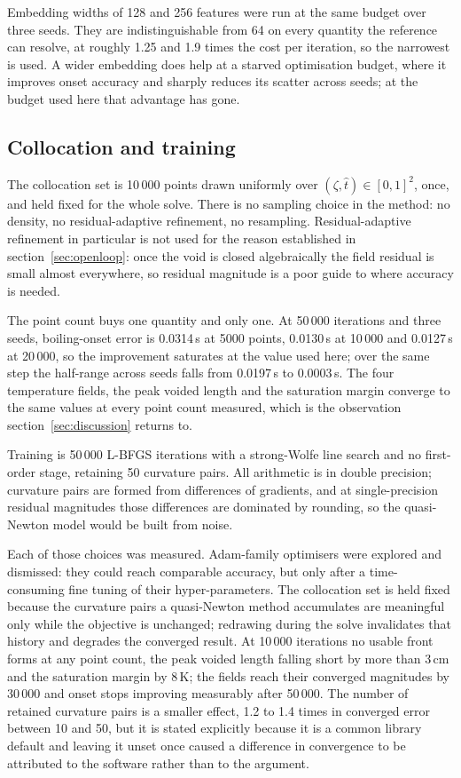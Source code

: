 \documentclass[11pt,a4paper]{article}
\begin{document}
Embedding widths of 128 and 256 features were run at the same budget over three seeds. They
are indistinguishable from 64 on every quantity the reference can resolve, at roughly 1.25
and 1.9 times the cost per iteration, so the narrowest is used. A wider embedding does help
at a starved optimisation budget, where it improves onset accuracy and sharply reduces its
scatter across seeds; at the budget used here that advantage has gone.

\subsection{Collocation and training}\label{sec:training}

The collocation set is 10\,000 points drawn uniformly over
$(\zeta,\hat{t}) \in [0,1]^2$, once, and held fixed for the whole solve. There is no
sampling choice in the method: no density, no residual-adaptive refinement, no resampling.
Residual-adaptive refinement in particular is not used for the reason established in
section~\ref{sec:openloop}: once the void is closed algebraically the field residual is
small almost everywhere, so residual magnitude is a poor guide to where accuracy is needed.

The point count buys one quantity and only one. At 50\,000 iterations and three seeds,
boiling-onset error is 0.0314\,s at 5000 points, 0.0130\,s at 10\,000 and 0.0127\,s at
20\,000, so the improvement saturates at the value used here; over the same step the
half-range across seeds falls from 0.0197\,s to 0.0003\,s. The four temperature fields, the
peak voided length and the saturation margin converge to the same values at every point
count measured, which is the observation section~\ref{sec:discussion} returns to.

Training is 50\,000 L-BFGS iterations \cite{nocedal} with a strong-Wolfe line search and no
first-order stage, retaining 50 curvature pairs. All arithmetic is in double precision;
curvature pairs are formed from differences of gradients, and at single-precision residual
magnitudes those differences are dominated by rounding, so the quasi-Newton model would be
built from noise.

Each of those choices was measured. Adam-family optimisers were explored and dismissed:
they could reach comparable accuracy, but only after a time-consuming fine tuning of their
hyper-parameters. The collocation set is held fixed because the
curvature pairs a quasi-Newton method accumulates are meaningful only while the objective
is unchanged; redrawing during the solve invalidates that history and degrades the
converged result. At
10\,000 iterations no usable front forms at any point count, the peak voided length falling
short by more than 3\,cm and the saturation margin by 8\,K; the fields reach their converged
magnitudes by 30\,000 and onset stops improving measurably after 50\,000. The number of retained curvature pairs is a smaller
effect, 1.2 to 1.4 times in converged error between 10 and 50, but it is stated explicitly
because it is a common library default and leaving it unset once caused a difference in
convergence to be attributed to the software rather than to the argument.
\end{document}
